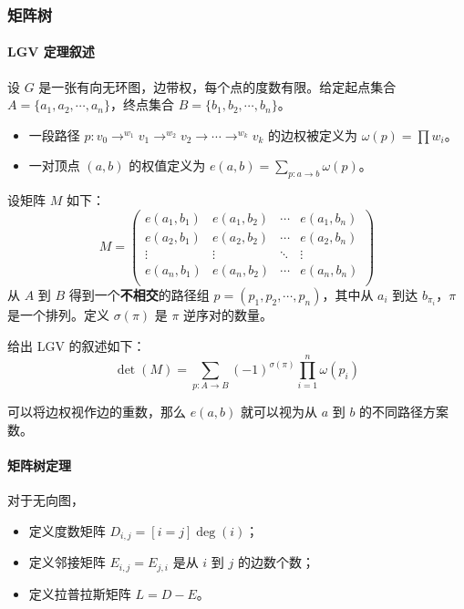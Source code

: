 \documentclass[10pt]{ctexart}
\providecommand{\tightlist}{\setlength{\itemsep}{0pt}\setlength{\parskip}{0pt}}
\begin{document}
\begin{multicols}{3}
    \subsubsection{矩阵树}\label{ux77e9ux9635ux6811}

    \paragraph{LGV 定理叙述}\label{lgv-ux5b9aux7406ux53d9ux8ff0}

    设 \(G\) 是一张有向无环图，边带权，每个点的度数有限。给定起点集合
    \(A=\{a_1,a_2, \cdots,a_n\}\)，终点集合
    \(B = \{b_1, b_2, \cdots,b_n\}\)。

    \begin{itemize}
    \tightlist
    \item
      一段路径
      \(p:v_0\to^{w_1} v_1\to^{w_2} v_2\to \cdots \to^{w_k} v_k\)
      的边权被定义为 \(\omega (p) = \prod w_i\)。
    \item
      一对顶点 \((a, b)\) 的权值定义为
      \(e(a, b) = \sum_{p:a\to b}\omega (p)\)。
    \end{itemize}

    设矩阵 \(M\) 如下：\[
    M = \begin{pmatrix}
    e(a_1, b_1) & e(a_1, b_2) & \cdots & e(a_1, b_n) \\
    e(a_2, b_1) & e(a_2, b_2) & \cdots & e(a_2, b_n) \\
    \vdots & \vdots & \ddots & \vdots \\
    e(a_n, b_1) & e(a_n, b_2) & \cdots & e(a_n, b_n) \\
    \end{pmatrix}
    \] 从 \(A\) 到 \(B\) 得到一个\textbf{不相交}的路径组
    \(p=(p_1, p_2, \cdots,p_n)\)，其中从 \(a_i\) 到达
    \(b_{\pi_i}\)，\(\pi\) 是一个排列。定义 \(\sigma(\pi)\) 是 \(\pi\)
    逆序对的数量。

    给出 LGV 的叙述如下：\[
    \det(M) = \sum_{p:A\to B} (-1)^{\sigma (\pi)} \prod_{i=1}^n \omega(p_i)
    \]

    可以将边权视作边的重数，那么 \(e(a, b)\) 就可以视为从 \(a\) 到 \(b\)
    的不同路径方案数。

    \paragraph{矩阵树定理}\label{ux77e9ux9635ux6811ux5b9aux7406}

    对于无向图，

    \begin{itemize}
    \tightlist
    \item
      定义度数矩阵 \(D_{i, j} = [i=j]\deg(i)\)；
    \item
      定义邻接矩阵 \(E_{i, j} = E_{j, i}\) 是从 \(i\) 到 \(j\)
      的边数个数；
    \item
      定义拉普拉斯矩阵 \(L = D - E\)。
    \end{itemize}


\end{multicols}
\end{document}
